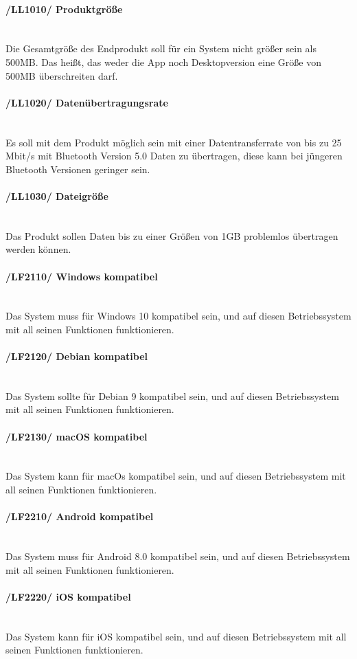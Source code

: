 \begin{indentE}\mbox{}
	\paragraph{/LL1010/ Produktgröße}\mbox{}\\
	Die Gesamtgröße des Endprodukt soll für ein System nicht größer sein als 500MB. Das heißt, das weder die App noch Desktopversion eine Größe von 500MB überschreiten darf.
	\paragraph{/LL1020/ Datenübertragungsrate}\mbox{}\\
	Es soll mit dem Produkt möglich sein mit einer Datentransferrate von bis zu 25 Mbit/s mit Bluetooth Version 5.0 Daten zu übertragen, diese kann bei jüngeren Bluetooth Versionen geringer sein.
	\paragraph{/LL1030/ Dateigröße}\mbox{}\\
	Das Produkt sollen Daten bis zu einer Größen von 1GB problemlos übertragen werden können.
	\paragraph{/LF2110/ Windows kompatibel}\mbox{}\\
	Das System muss für Windows 10 kompatibel sein, und auf diesen Betriebssystem mit all seinen Funktionen funktionieren.
	\paragraph{/LF2120/ Debian kompatibel}\mbox{}\\
	Das System sollte für Debian 9 kompatibel sein, und auf diesen Betriebssystem mit all seinen Funktionen funktionieren.
	\paragraph{/LF2130/ macOS kompatibel}\mbox{}\\
	Das System kann für macOs kompatibel sein, und auf diesen Betriebssystem mit all seinen Funktionen funktionieren.
	\paragraph{/LF2210/ Android kompatibel}\mbox{}\\
	Das System muss für Android 8.0 kompatibel sein, und auf diesen Betriebssystem mit all seinen Funktionen funktionieren.
	\paragraph{/LF2220/ iOS kompatibel}\mbox{}\\
	Das System kann für iOS kompatibel sein, und auf diesen Betriebssystem mit all seinen Funktionen funktionieren.
\end{indentE}
